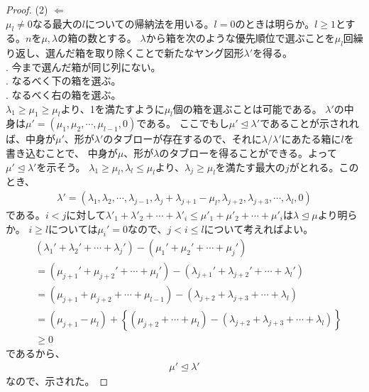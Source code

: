 \documentclass[a4paper,11pt]{jsarticle}
\theoremstyle{plain}
\theoremstyle{definition}
\renewcommand{\(}{\left(}
\renewcommand{\)}{\right)}
\renewcommand{\[}{\left[}
\renewcommand{\]}{\right]}
\renewcommand{\{}{\left\lbrace}
\renewcommand{\}}{\right\rbrace}
\begin{document}
\begin{proof}
    \subitem (2) $\Longleftarrow$ \\
    $\mu_l \neq 0$なる最大の$l$についての帰納法を用いる。$l=0$のときは明らか。$l \geq 1$とする。$n$を$\mu, \lambda$の箱の数とする。
    $\lambda$から箱を次のような優先順位で選ぶことを$\mu_l$回繰り返し、選んだ箱を取り除くことで新たなヤング図形$\lambda'$を得る。\\
    . 今まで選んだ箱が同じ列にない。\\
    . なるべく下の箱を選ぶ。\\
    . なるべく右の箱を選ぶ。\\
    $\lambda_1 \geq \mu_1 \geq \mu_l$より、1を満たすように$\mu_l$個の箱を選ぶことは可能である。
    $\lambda'$の中身は$\mu' = (\mu_1, \mu_2, \cdots, \mu_{l-1},0)$である。
    ここでもし$\mu' \trianglelefteq \lambda'$であることが示されれば、中身が$\mu'$、形が$\lambda'$のタブローが存在するので、それに$\lambda/\lambda'$にあたる箱に$l$を書き込むことで、
    中身が$\mu$、形が$\lambda$のタブローを得ることができる。よって$\mu' \trianglelefteq \lambda'$を示そう。
    $\lambda_1 \geq \mu_l, \lambda_l \leq \mu_l$より、$\lambda_j \geq \mu_l$を満たす最大の$j$がとれる。このとき、
    \begin{align*}
        \lambda' = (\lambda_1, \lambda_2, \cdots, \lambda_{j-1}, \lambda_{j} + \lambda_{j+1} - \mu_l, \lambda_{j+2}, \lambda_{j+3}, \cdots, \lambda_l,0)
    \end{align*}
    である。$i < j$に対して$\lambda'_1 + \lambda'_2 + \cdots +  \lambda'_i \leq \mu'_1 + \mu'_2 + \cdots +  \mu'_i$は$\lambda \trianglelefteq \mu$より明らか。
    $i \geq l$については$\mu_i' = 0$なので、$j < i \leq l$について考えればよい。
    \begin{align*}
        & (\lambda_1' + \lambda_2' + \cdots + \lambda_j') - (\mu_1' + \mu_2' + \cdots + \mu_j') \\ 
        &= (\mu_{j+1}' + \mu_{j+2}' + \cdots + \mu_l') - (\lambda_{j+1}' + \lambda_{j+2}' + \cdots + \lambda_l') \\
        &= (\mu_{j+1} + \mu_{j+2} + \cdots + \mu_{l-1}) - (\lambda_{j+2} + \lambda_{j+3} + \cdots + \lambda_l) \\
        &= (\mu_{j+1} - \mu_{l}) + \{(\mu_{j+2} + \cdots + \mu_{l}) - (\lambda_{j+2} + \lambda_{j+3} + \cdots + \lambda_l)\} \\
        &\geq 0
    \end{align*}
    であるから、
    \begin{align*}
        \mu' \trianglelefteq \lambda'
    \end{align*}
    なので、示された。
\end{proof}
\end{document}
